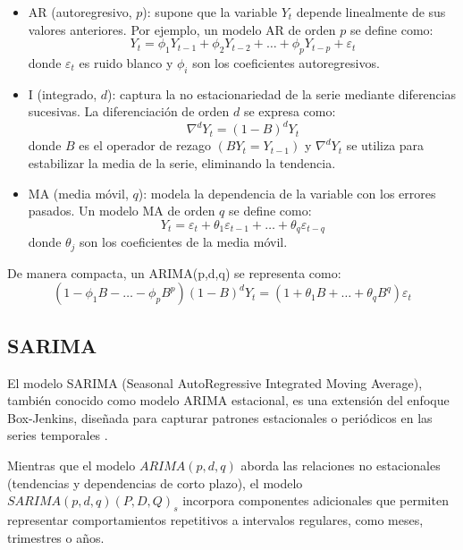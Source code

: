 \begin{itemize}
\item AR (autoregresivo, $p$): supone que la variable $Y_t$ depende linealmente de sus valores anteriores. Por ejemplo, un modelo AR de orden $p$ se define como:
\begin{equation}
 Y_t = \phi_1 Y_{t-1} + \phi_2 Y_{t-2} + \dots + \phi_p Y_{t-p} + \varepsilon_t
\end{equation}
 donde $\varepsilon_t$ es ruido blanco y $\phi_i$ son los coeficientes autoregresivos.

\item I (integrado, $d$): captura la no estacionariedad de la serie mediante diferencias sucesivas. La diferenciación de orden $d$ se expresa como:
\begin{equation}
 \nabla^d Y_t = (1-B)^d Y_t
\end{equation}
 donde $B$ es el operador de rezago $(B Y_t = Y_{t-1})$ y $\nabla^d Y_t$ se utiliza para estabilizar la media de la serie, eliminando la tendencia.

\item MA (media móvil, $q$): modela la dependencia de la variable con los errores pasados. Un modelo MA de orden $q$ se define como:
\begin{equation}
 Y_t = \varepsilon_t + \theta_1 \varepsilon_{t-1} + \dots + \theta_q \varepsilon_{t-q}
\end{equation}
 donde $\theta_j$ son los coeficientes de la media móvil.

\end{itemize}

\justify
De manera compacta, un ARIMA(p,d,q) se representa como:
\begin{equation}
 (1 - \phi_1 B - \dots - \phi_p B^p)(1 - B)^d Y_t = (1 + \theta_1 B + \dots + \theta_q B^q) \varepsilon_t
\end{equation}

\subsection{SARIMA}
\justify
El modelo SARIMA (Seasonal AutoRegressive Integrated Moving Average), también conocido como modelo ARIMA estacional, es una extensión del enfoque Box-Jenkins, diseñada para capturar patrones estacionales o periódicos en las series temporales \cite{vagropoulos2016comparison}.

\justify
Mientras que el modelo $ARIMA(p, d, q)$ aborda las relaciones no estacionales (tendencias y dependencias de corto plazo), el modelo $SARIMA(p, d, q)(P, D, Q)_s$ incorpora componentes adicionales que permiten representar comportamientos repetitivos a intervalos regulares, como meses, trimestres o años.

